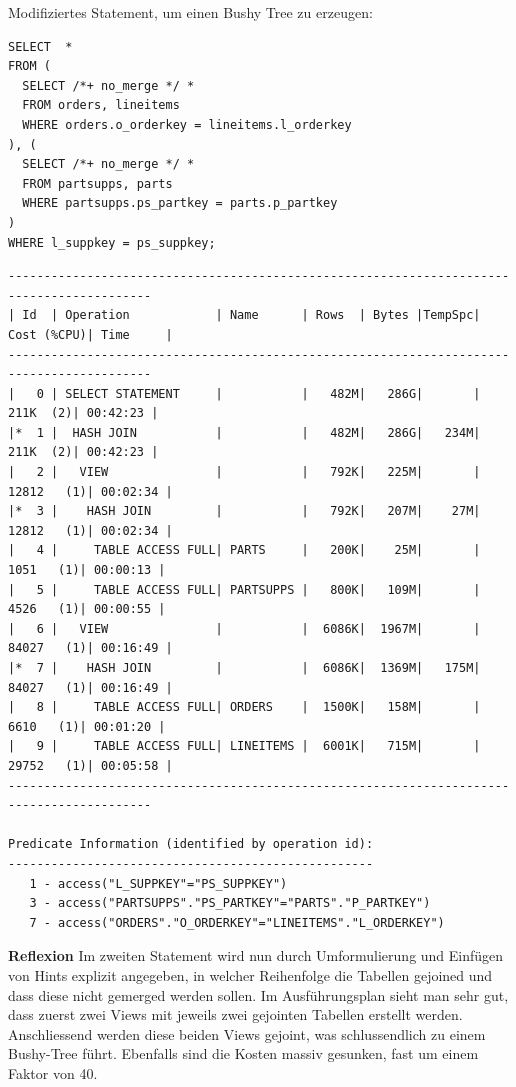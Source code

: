 \documentclass[10pt]{article}
\begin{document}
\newpage
Modifiziertes Statement, um einen Bushy Tree zu erzeugen:
\begin{lstlisting}[style=sql]
SELECT  *
FROM (
  SELECT /*+ no_merge */ *
  FROM orders, lineitems
  WHERE orders.o_orderkey = lineitems.l_orderkey
), (
  SELECT /*+ no_merge */ *
  FROM partsupps, parts
  WHERE partsupps.ps_partkey = parts.p_partkey
)
WHERE l_suppkey = ps_suppkey;
\end{lstlisting}
\begin{lstlisting}[style=queryexecutionplan]
------------------------------------------------------------------------------------------
| Id  | Operation            | Name      | Rows  | Bytes |TempSpc| Cost (%CPU)| Time     |
------------------------------------------------------------------------------------------
|   0 | SELECT STATEMENT     |           |   482M|   286G|       |   211K  (2)| 00:42:23 |
|*  1 |  HASH JOIN           |           |   482M|   286G|   234M|   211K  (2)| 00:42:23 |
|   2 |   VIEW               |           |   792K|   225M|       | 12812   (1)| 00:02:34 |
|*  3 |    HASH JOIN         |           |   792K|   207M|    27M| 12812   (1)| 00:02:34 |
|   4 |     TABLE ACCESS FULL| PARTS     |   200K|    25M|       |  1051   (1)| 00:00:13 |
|   5 |     TABLE ACCESS FULL| PARTSUPPS |   800K|   109M|       |  4526   (1)| 00:00:55 |
|   6 |   VIEW               |           |  6086K|  1967M|       | 84027   (1)| 00:16:49 |
|*  7 |    HASH JOIN         |           |  6086K|  1369M|   175M| 84027   (1)| 00:16:49 |
|   8 |     TABLE ACCESS FULL| ORDERS    |  1500K|   158M|       |  6610   (1)| 00:01:20 |
|   9 |     TABLE ACCESS FULL| LINEITEMS |  6001K|   715M|       | 29752   (1)| 00:05:58 |
------------------------------------------------------------------------------------------

Predicate Information (identified by operation id):
---------------------------------------------------
   1 - access("L_SUPPKEY"="PS_SUPPKEY")
   3 - access("PARTSUPPS"."PS_PARTKEY"="PARTS"."P_PARTKEY")
   7 - access("ORDERS"."O_ORDERKEY"="LINEITEMS"."L_ORDERKEY")
\end{lstlisting}
\textbf{Reflexion} \newline
Im zweiten Statement wird nun durch Umformulierung und Einfügen von Hints explizit angegeben, in welcher Reihenfolge die Tabellen gejoined und dass diese nicht gemerged werden sollen. Im Ausführungsplan sieht man sehr gut, dass zuerst zwei Views mit jeweils zwei gejointen Tabellen erstellt werden. Anschliessend werden diese beiden Views gejoint, was schlussendlich zu einem Bushy-Tree führt. Ebenfalls sind die Kosten massiv gesunken, fast um einem Faktor von 40.
\end{document}

